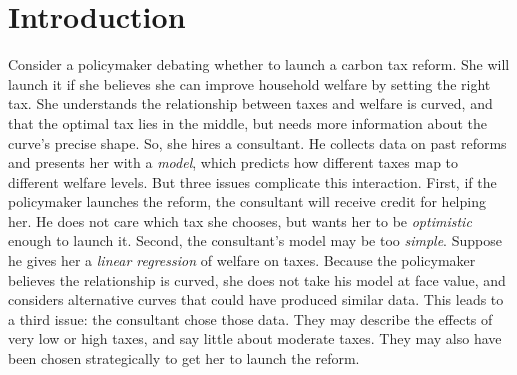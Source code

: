\documentclass[11pt,dvipsnames]{article}
\begin{document}
\begin{titlingpage}
\begin{abstract}
\end{abstract}
\end{titlingpage}


\onehalfspacing

\section{Introduction}
Consider a policymaker debating whether to launch a carbon tax reform.
She will launch it if she believes she can improve household welfare by setting the right tax.
She understands the relationship between taxes and welfare is curved, and that the optimal tax lies in the middle, but needs more information about the curve's precise shape.
So, she hires a consultant.
He collects data on past reforms and presents her with a \emph{model}, which predicts how different taxes map to different welfare levels.
But three issues complicate this interaction.
First, if the policymaker launches the reform, the consultant will receive credit for helping her.
He does not care which tax she chooses, but wants her to be \emph{optimistic} enough to launch it.
Second, the consultant's model may be too \emph{simple}.
Suppose he gives her a \emph{linear regression} of welfare on taxes.
Because the policymaker believes the relationship is curved, she does not take his model at face value, and considers alternative curves that could have produced similar data.
This leads to a third issue: the consultant chose those data.
They may describe the effects of very low or high taxes, and say little about moderate taxes.
They may also have been chosen strategically to get her to launch the reform.
\end{document}
